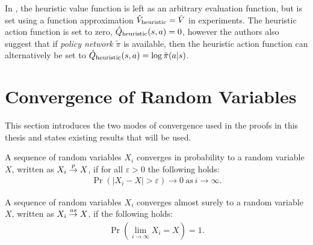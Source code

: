     In \cite{ments}, the heuristic value function is left as an arbitrary evaluation function, but is set using a function approximation ${\hat{V}_{\textnormal{heuristic}}}=\tilde{V}$ in experiments. The heuristic action function is set to zero, ${\hat{Q}_{\textnormal{heuristic}}}(s,a)=0$, however the authors also suggest that if \textit{policy network} $\tilde{\pi}$ is available, then the heuristic action function can alternatively be set to ${\hat{Q}_{\textnormal{heuristic}}}(s,a)=\log \tilde{\pi}(a|s)$. 















\section{Convergence of Random Variables}
\label{sec:2-5-convergence}

    This section introduces the two modes of convergence used in the proofs in this thesis and states existing results that will be used.

    \begin{defn}
        \label{def:2:convergence_in_probability}
        A sequence of random variables $X_i$ \textnormal{converges in probability} to a random variable $X$, written as $X_i \overset{p}{\to} X$, if for all $\varepsilon>0$ the following holds:
        \begin{align}
            \Pr\left(\left|X_i - X\right| > \varepsilon\right) \rightarrow 0 \ \text{as} \ i \rightarrow \infty.
        \end{align}
    \end{defn}

    \begin{defn}
        \label{def:2:convergence_almost_surely}
        A sequence of random variables $X_i$ \textnormal{converges almost surely} to a random variable $X$, written as $X_i \overset{as}{\to} X$, if the following holds:
        \begin{align}
            \Pr\left(\lim_{i\rightarrow\infty} X_i = X\right) = 1.
        \end{align}
    \end{defn}

